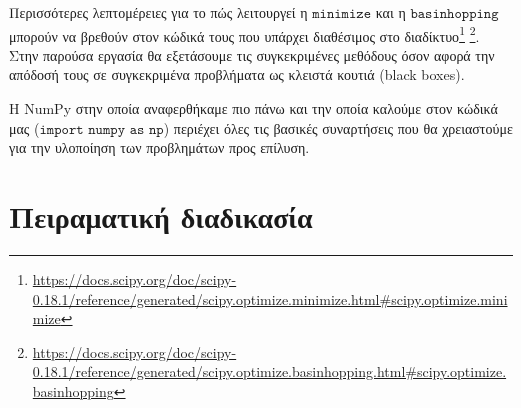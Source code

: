 \documentclass[a4paper,12pt,twoside]{report}
\theoremstyle{plain}
\theoremstyle{definition}
\theoremstyle{remark}
\begin{document}
Περισσότερες λεπτομέρειες για το πώς λειτουργεί η  $\texttt{minimize}$ και η  $\texttt{basinhopping}$ μπορούν να βρεθούν στον κώδικά τους που υπάρχει διαθέσιμος στο διαδίκτυο\footnote{\url{https://docs.scipy.org/doc/scipy-0.18.1/reference/generated/scipy.optimize.minimize.html\#scipy.optimize.minimize}}
\footnote{\url{https://docs.scipy.org/doc/scipy-0.18.1/reference/generated/scipy.optimize.basinhopping.html\#scipy.optimize.basinhopping}}. Στην παρούσα εργασία θα εξετάσουμε τις συγκεκριμένες μεθόδους όσον αφορά την απόδοσή τους σε συγκεκριμένα προβλήματα ως κλειστά κουτιά (black boxes).

H NumPy στην οποία αναφερθήκαμε πιο πάνω και την οποία καλούμε στον κώδικά μας ($\texttt{import numpy as np}$) περιέχει όλες τις βασικές συναρτήσεις που θα χρειαστούμε για την υλοποίηση των προβλημάτων προς επίλυση.
\newpage
\chapter{Πειραματική διαδικασία}
\end{document}
